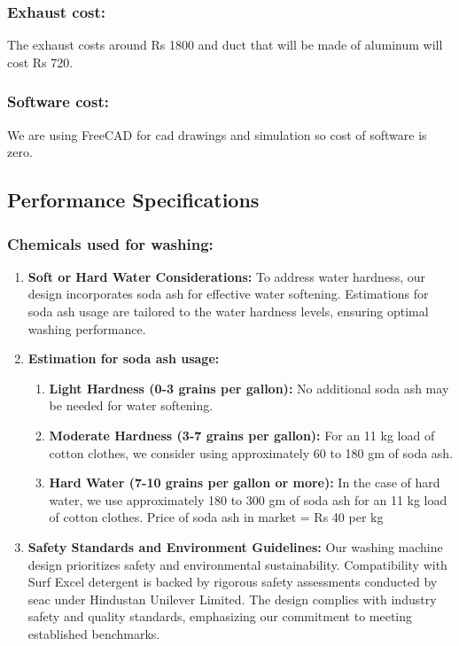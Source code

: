 \documentclass[12pt]{article} %
\begin{document}
\subsubsection{Exhaust cost:} The exhaust costs around Rs 1800 and duct that will be made of aluminum will cost Rs 720. 

\subsubsection{Software cost:} We are using FreeCAD for \acrshort{cad} drawings and simulation so cost of software is zero.

\subsection{Performance Specifications}
   \subsubsection{Chemicals used for washing:}
   \begin{enumerate}
   \item \textbf{Soft or Hard Water Considerations:} To address water hardness, our design incorporates soda ash for effective water softening. Estimations for soda ash usage are tailored to the water hardness levels, ensuring optimal washing performance.                  
\item \textbf{Estimation for soda ash usage:}
\begin{enumerate}
\item \textbf{Light Hardness (0-3 grains per gallon):} No additional soda ash may be needed for water softening.                                 
\item \textbf{Moderate Hardness (3-7 grains per gallon):} For an 11 kg load of cotton clothes, we consider using approximately 60 to 180 gm of soda ash.  
\item \textbf{Hard Water (7-10 grains per gallon or more):} In the case of hard water,  we use approximately 180 to 300 gm of soda ash for an 11 kg load of cotton clothes. Price of soda ash in market = Rs 40 per kg
\end{enumerate}
\item \textbf{Safety Standards and Environment Guidelines:} Our washing machine design prioritizes safety and environmental sustainability. Compatibility with Surf Excel detergent is backed by rigorous safety assessments conducted by \gls{seac} under Hindustan Unilever Limited. The design complies with industry safety and quality standards, emphasizing our commitment to meeting established benchmarks.

\end{enumerate}
\end{document}
